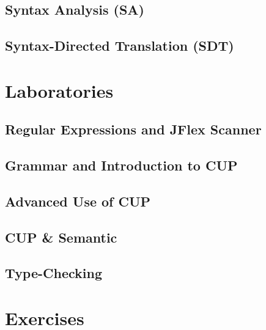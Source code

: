 \documentclass[pdfa,cucitura]{toptesi}
\begin{document}
\chapter{Syntax Analysis (SA)}


\chapter{Syntax-Directed Translation (SDT)}




\part{Laboratories}
\chapter{Regular Expressions and JFlex Scanner}


\chapter{Grammar and Introduction to CUP}


\chapter{Advanced Use of CUP}


\chapter{CUP \& Semantic}


\chapter{Type-Checking}


\part{Exercises}

\end{document}
